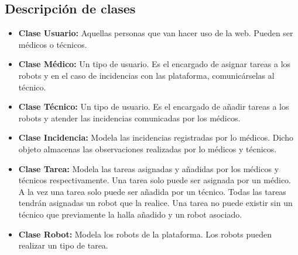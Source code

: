 \documentclass{scrreprt}
\begin{document}
\subsection{Descripción de clases}

\begin{itemize}

    \item \textbf{Clase Usuario:}  Aquellas personas que van hacer uso de la web. Pueden ser médicos o técnicos. 
    \item \textbf{Clase Médico:} Un tipo de usuario. Es el encargado de asignar tareas a los robots y en el caso de incidencias con las plataforma, comunicárselas al técnico. 
    \item \textbf{Clase Técnico:} Un tipo de usuario. Es el encargado de añadir tareas a los robots y atender las incidencias comunicadas por los médicos. 
    \item \textbf{Clase Incidencia:} Modela las incidencias registradas por lo médicos. Dicho objeto almacenas las observaciones realizadas por lo médicos y técnicos.
    \item \textbf{Clase Tarea:} Modela las tareas asignadas y añadidas por los médicos y técnicos respectivamente. Una tarea solo puede ser asignada por un médico. A la vez una tarea solo puede ser añadida por un técnico. Todas las tareas tendrán asignadas un robot que la realice. Una tarea no puede existir sin un técnico que previamente la halla añadido y un robot asociado.
     \item \textbf{Clase Robot:} Modela los robots de la plataforma. Los robots pueden realizar un tipo de tarea.
\end{itemize}
\end{document}
